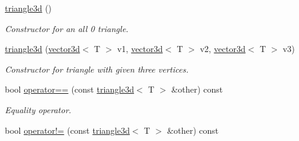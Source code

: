 \begin{DoxyCompactItemize}
\item 
\hyperlink{classirr_1_1core_1_1triangle3d_a4626559294771a8a2fb0cbbaedb6c5f9}{triangle3d} ()\hypertarget{classirr_1_1core_1_1triangle3d_a4626559294771a8a2fb0cbbaedb6c5f9}{}\label{classirr_1_1core_1_1triangle3d_a4626559294771a8a2fb0cbbaedb6c5f9}

\begin{DoxyCompactList}\small\item\em Constructor for an all 0 triangle. \end{DoxyCompactList}\item 
\hyperlink{classirr_1_1core_1_1triangle3d_a489813c59bd130d256640ba4e2745505}{triangle3d} (\hyperlink{classirr_1_1core_1_1vector3d}{vector3d}$<$ T $>$ v1, \hyperlink{classirr_1_1core_1_1vector3d}{vector3d}$<$ T $>$ v2, \hyperlink{classirr_1_1core_1_1vector3d}{vector3d}$<$ T $>$ v3)\hypertarget{classirr_1_1core_1_1triangle3d_a489813c59bd130d256640ba4e2745505}{}\label{classirr_1_1core_1_1triangle3d_a489813c59bd130d256640ba4e2745505}

\begin{DoxyCompactList}\small\item\em Constructor for triangle with given three vertices. \end{DoxyCompactList}\item 
bool \hyperlink{classirr_1_1core_1_1triangle3d_a1541eda9f2baabc1f23eecb520c6fef2}{operator==} (const \hyperlink{classirr_1_1core_1_1triangle3d}{triangle3d}$<$ T $>$ \&other) const \hypertarget{classirr_1_1core_1_1triangle3d_a1541eda9f2baabc1f23eecb520c6fef2}{}\label{classirr_1_1core_1_1triangle3d_a1541eda9f2baabc1f23eecb520c6fef2}

\begin{DoxyCompactList}\small\item\em Equality operator. \end{DoxyCompactList}\item 
bool \hyperlink{classirr_1_1core_1_1triangle3d_a5a3b0b9e0ae5bc1c4c9bf11c06e9d30d}{operator!=} (const \hyperlink{classirr_1_1core_1_1triangle3d}{triangle3d}$<$ T $>$ \&other) const \hypertarget{classirr_1_1core_1_1triangle3d_a5a3b0b9e0ae5bc1c4c9bf11c06e9d30d}{}\label{classirr_1_1core_1_1triangle3d_a5a3b0b9e0ae5bc1c4c9bf11c06e9d30d}


\end{DoxyCompactItemize}
